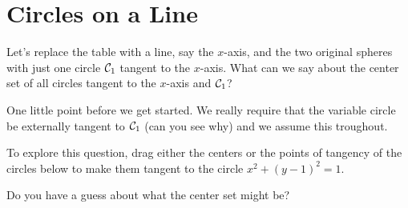 \documentclass{ximera}
\begin{document}
\section{Circles on a Line}
\begin{exploration}
Let's replace the table with a line, say the $x$-axis, and the two original spheres with just one circle ${\cal C}_1$ tangent to the $x$-axis. What can we say about the center set of all circles tangent to the $x$-axis and ${\cal C}_1$?

One little point before we get started. We really require that the variable circle be externally tangent to ${\cal C}_1$ (can you see why) and we assume this troughout.

To explore this question, drag either the centers or the points of tangency of the circles below to make them tangent to the circle $x^2 + (y-1)^2=1$.

Do  you have a guess about what the center set might be?

 
\begin{onlineOnly}
    \begin{center}
\end{center}
\end{onlineOnly}
\end{exploration}
\end{document}
